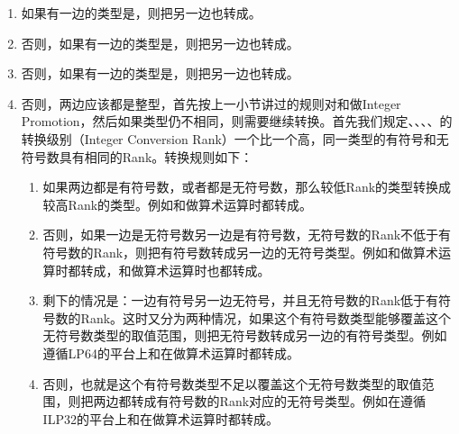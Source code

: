 \begin{enumerate}

\item 如果有一边的类型是，则把另一边也转成。

\item 否则，如果有一边的类型是，则把另一边也转成。

\item 否则，如果有一边的类型是，则把另一边也转成。

\item 否则，两边应该都是整型，首先按上一小节讲过的规则对和做Integer Promotion，然后如果类型仍不相同，则需要继续转换。首先我们规定、、、、的转换级别（Integer Conversion Rank）一个比一个高，同一类型的有符号和无符号数具有相同的Rank。转换规则如下：


\begin{enumerate}[label=\alph*.]

\item 如果两边都是有符号数，或者都是无符号数，那么较低Rank的类型转换成较高Rank的类型。例如和做算术运算时都转成。

\item 否则，如果一边是无符号数另一边是有符号数，无符号数的Rank不低于有符号数的Rank，则把有符号数转成另一边的无符号类型。例如和做算术运算时都转成，和做算术运算时也都转成。

\item 剩下的情况是：一边有符号另一边无符号，并且无符号数的Rank低于有符号数的Rank。这时又分为两种情况，如果这个有符号数类型能够覆盖这个无符号数类型的取值范围，则把无符号数转成另一边的有符号类型。例如遵循LP64的平台上和在做算术运算时都转成。

\item 否则，也就是这个有符号数类型不足以覆盖这个无符号数类型的取值范围，则把两边都转成有符号数的Rank对应的无符号类型。例如在遵循ILP32的平台上和在做算术运算时都转成。
\end{enumerate}
\end{enumerate}


